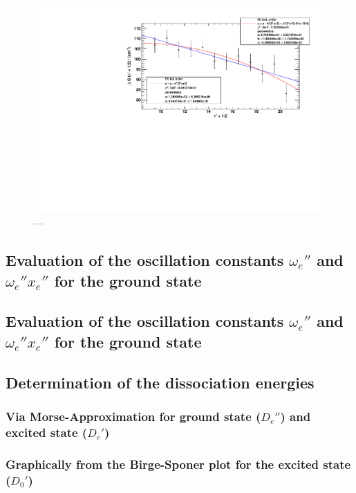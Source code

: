 \begin{figure}[H]
\begin{center}
  \includegraphics[width=\textwidth]{../img/prog3_birgesponer.pdf}
  \caption[---]{---}
  \label{img:prog3}
\end{center}
\end{figure}


\subsection{Evaluation of the oscillation constants $\omega_e''$ and $\omega_e'' x_e''$ for the ground state}



\subsection{Evaluation of the oscillation constants $\omega_e''$ and $\omega_e'' x_e''$ for the ground state}

\subsection{Determination of the dissociation energies}

\subsubsection{Via Morse-Approximation for ground state ($D_e''$) and excited state ($D_e'$)}

\subsubsection{Graphically from the Birge-Sponer plot for the excited state ($D_0'$)}

